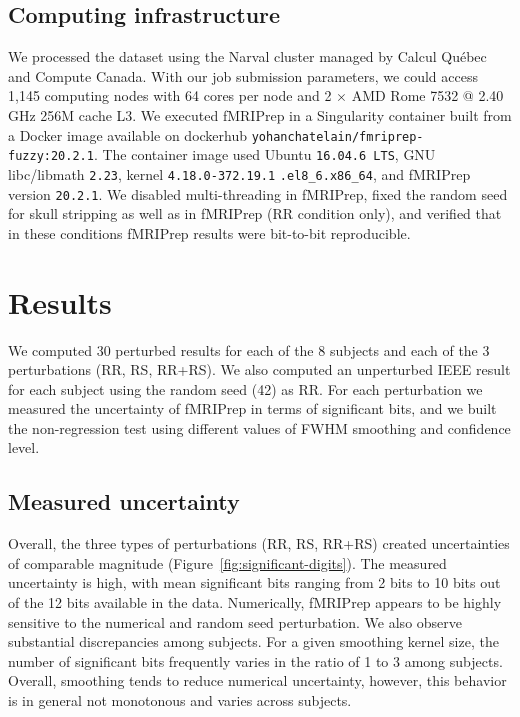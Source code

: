 \documentclass{article}
\newcommand{\TG}[1]{\color{blue}\textsc{From Tristan:} #1\color{black}\xspace}
\newcommand{\fmriprep}{fMRIPrep\xspace}
\begin{document}


\subsection{Computing infrastructure}

We processed the dataset using the Narval cluster managed by Calcul Qu\'ebec and
Compute Canada. With our job submission parameters, we could access 1,145
computing nodes with 64 cores per node and 2 $\times$ AMD Rome 7532 @ 2.40 GHz
256M cache L3. We executed \fmriprep in a Singularity container built from a
Docker image available on dockerhub \texttt{yohanchatelain/fmriprep-fuzzy:20.2.1}.
The container image used Ubuntu \texttt{16.04.6 LTS}, GNU
libc/libmath \texttt{2.23}, kernel \texttt{4.18.0-372.19.1}
\texttt{.el8\_6.x86\_64}, and fMRIPrep version \texttt{20.2.1}. We disabled
multi-threading in fMRIPrep, fixed the random seed for skull stripping as well
as in fMRIPrep (RR condition only), and verified that in these conditions
fMRIPrep results were bit-to-bit reproducible.

\section{Results}

We computed 30 perturbed results for each of the 8 subjects and each of the 3
perturbations (RR, RS, RR+RS). We also computed an unperturbed IEEE
result for each subject using the random seed (42) as RR. For each perturbation we
measured the uncertainty of fMRIPrep in terms of significant bits, and we
built the non-regression test using different values of FWHM smoothing and confidence level.

\subsection{Measured uncertainty}

Overall, the three types of perturbations (RR, RS, RR+RS) created uncertainties
of comparable magnitude (Figure~\ref{fig:significant-digits}). The measured
uncertainty is high, with mean significant bits ranging from 2 bits to 10 bits
out of the 12 bits available in the data. Numerically, \fmriprep appears to be
highly sensitive to the numerical and random seed perturbation. We also observe
substantial discrepancies among subjects. For a given smoothing kernel size, the
number of significant bits frequently varies in the ratio of 1 to 3 among
subjects. Overall, smoothing tends to reduce numerical uncertainty, however,
this behavior is in general not monotonous and varies across subjects.
\end{document}
